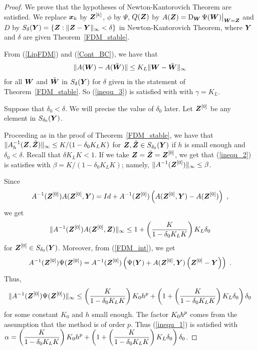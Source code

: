 \begin{proof}
We prove that the hypotheses of Newton-Kantorovich Theorem are
satisfied.  We replace $\bm{x}_k$ by $\displaystyle \bm{Z}^{[k]}$, $\phi$
by $\Psi$, $Q(\bm{Z})$ by $\displaystyle A(\bm{Z})
= \operatorname{D}_{\bm{W}} \Psi(\bm{W})\big|_{\bm{W} = \bm{Z}}$ and
$D$ by
$S_\delta(\bm{Y}) = \{ \bm{Z} : \|\bm{Z} - \bm{Y}\|_\infty < \delta \}$
in Newton-Kantorovich Theorem, where $\bm{Y}$ and $\delta$ are given
Theorem~\ref{FDM_stable}.

From (\ref{LipFDM}) and (\ref{Cont_BC}), we have that
\[
\| A(\bm{W}) - A(\tilde{\bm{W}}) \| \leq K_L
\| \bm{W} - \tilde{\bm{W}} \|_\infty
\]
for all $\bm{W}$ and $\tilde{\bm{W}}$ in $S_\delta(\bm{Y})$
for $\delta$ given in the statement of Theorem~\ref{FDM_stable}.
So (\ref{inequ_3}) is satisfied with with $\gamma = K_L$.

Suppose that $\delta_0 < \delta$.  We will precise the value of
$\delta_0$ later.  Let $\displaystyle \bm{Z}^{[0]}$ be any element in 
$S_{\delta_0}(\bm{Y})$.

Proceeding as in the proof of Theorem~\ref{FDM_stable}, we have that
$\displaystyle \| A_h^{-1}(\bm{Z},\tilde{\bm{Z}}) \|_\infty
\leq K/(1-\delta_0 K_L K)$
for $\bm{Z} , \tilde{\bm{Z}} \in S_{\delta_0}(\bm{Y})$ if
$h$ is small enough and $\delta_0 < \delta$.  Recall that
$\delta K_L K < 1$.  If we take
$\displaystyle \bm{Z} = \tilde{\bm{Z}} = \bm{Z}^{[0]}$, we get that 
(\ref{inequ_2}) is satisfies with $\beta = K/(1-\delta_0 K_L K)$;
namely,  $\displaystyle \| A^{-1}(\bm{Z}^{[0]}) \|_\infty \leq \beta$.

Since
\[
A^{-1}(\bm{Z}^{[0]}) A(\bm{Z}^{[0]}, \bm{Y}) = Id
+ A^{-1}(\bm{Z}^{[0]}) \left( A(\bm{Z}^{[0]},\bm{Y})
- A(\bm{Z}^{[0]})\right) \ ,
\]
we get
\[
\| A^{-1}(\bm{Z}^{[0]}) A(\bm{Z}^{[0]},\bm{Z}) \|_\infty
\leq 1 + \left(\frac{K}{1-\delta_0 K_L K}\right) K_L \delta_0
\]
for $\displaystyle \bm{Z}^{[0]} \in S_{\delta_0}(\bm{Y})$.
Moreover, from (\ref{FDM_int}), we get
\[
A^{-1}(\bm{Z}^{[0]}) \Psi(\bm{Z}^{[0]}) =
A^{-1}(\bm{Z}^{[0]}) \left( \Psi(\bm{Y}) +
A(\bm{Z}^{[0]},\bm{Y}) \left( \bm{Z}^{[0]}
- \bm{Y} \right) \right) \ .
\]
Thus,
\[
\| A^{-1}(\bm{Z}^{[0]}) \Psi(\bm{Z}^{[0]}) \|_\infty
\leq \left(\frac{K}{1-\delta_0 K_L K}\right) K_0 h^p
+ \left( 1 + \left(\frac{K}{1-\delta_0 K_L K}\right) K_L\delta_0
\right) \delta_0
\]
for some constant $K_0$ and $h$ small enough.  The factor
$\displaystyle K_0h^p$ comes from the assumption that the method is of
order $p$.  Thus (\ref{inequ_1}) is satisfied with 
$\displaystyle \alpha = \left(\frac{K}{1-\delta_0 K_L K} \right) K_0 h^p
+ \left( 1 + \left(\frac{K}{1-\delta_0 K_L K}\right)K_L\delta_0
\right) \delta_0$.


\end{proof}
